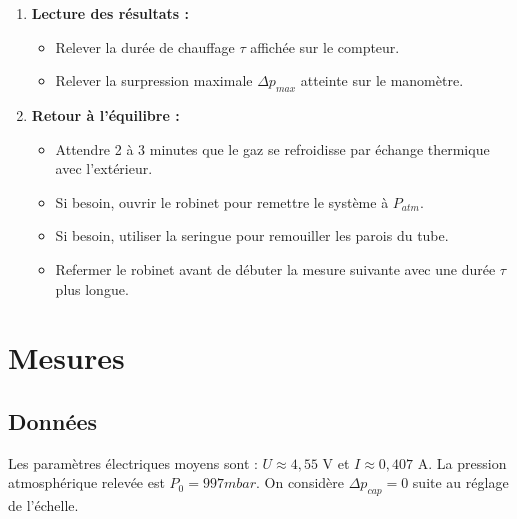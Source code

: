 \documentclass[a4paper,9pt,french]{scrartcl}
\begin{document}
\begin{enumerate}
    \item \textbf{Lecture des résultats :}
    \begin{itemize}
        \item Relever la durée de chauffage $\tau$ affichée sur le compteur.
        \item Relever la surpression maximale $\Delta p_{max}$ atteinte sur le manomètre.
    \end{itemize}

    \item \textbf{Retour à l'équilibre :}
    \begin{itemize}
        \item Attendre 2 à 3 minutes que le gaz se refroidisse par échange thermique avec l'extérieur.
        \item Si besoin, ouvrir le robinet pour remettre le système à $P_{atm}$.
        \item Si besoin, utiliser la seringue pour remouiller les parois du tube.
        \item Refermer le robinet avant de débuter la mesure suivante avec une durée $\tau$ plus longue.
    \end{itemize}
\end{enumerate}
\section{Mesures}
\subsection{Données}
Les paramètres électriques moyens sont : $U \approx 4,55$ V et $I \approx 0,407$ A.
La pression atmosphérique relevée est $P_0 = 997 mbar$. On considère $\Delta p_{cap} = 0$ suite au réglage de l'échelle.
\end{document}
